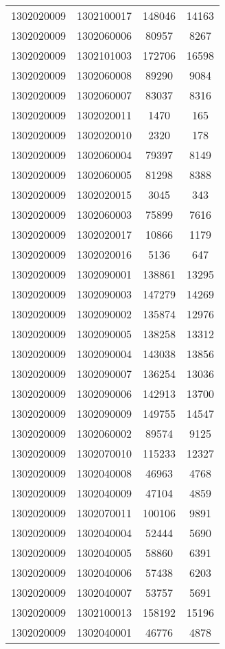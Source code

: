 \begin{longtable}{llcc}
1302020009 & 1302100017 & 148046 & 14163\\
1302020009 & 1302060006 & 80957 & 8267\\
1302020009 & 1302101003 & 172706 & 16598\\
1302020009 & 1302060008 & 89290 & 9084\\
1302020009 & 1302060007 & 83037 & 8316\\
1302020009 & 1302020011 & 1470 & 165\\
1302020009 & 1302020010 & 2320 & 178\\
1302020009 & 1302060004 & 79397 & 8149\\
1302020009 & 1302060005 & 81298 & 8388\\
1302020009 & 1302020015 & 3045 & 343\\
1302020009 & 1302060003 & 75899 & 7616\\
1302020009 & 1302020017 & 10866 & 1179\\
1302020009 & 1302020016 & 5136 & 647\\
1302020009 & 1302090001 & 138861 & 13295\\
1302020009 & 1302090003 & 147279 & 14269\\
1302020009 & 1302090002 & 135874 & 12976\\
1302020009 & 1302090005 & 138258 & 13312\\
1302020009 & 1302090004 & 143038 & 13856\\
1302020009 & 1302090007 & 136254 & 13036\\
1302020009 & 1302090006 & 142913 & 13700\\
1302020009 & 1302090009 & 149755 & 14547\\
1302020009 & 1302060002 & 89574 & 9125\\
1302020009 & 1302070010 & 115233 & 12327\\
1302020009 & 1302040008 & 46963 & 4768\\
1302020009 & 1302040009 & 47104 & 4859\\
1302020009 & 1302070011 & 100106 & 9891\\
1302020009 & 1302040004 & 52444 & 5690\\
1302020009 & 1302040005 & 58860 & 6391\\
1302020009 & 1302040006 & 57438 & 6203\\
1302020009 & 1302040007 & 53757 & 5691\\
1302020009 & 1302100013 & 158192 & 15196\\
1302020009 & 1302040001 & 46776 & 4878\\

\end{longtable}
